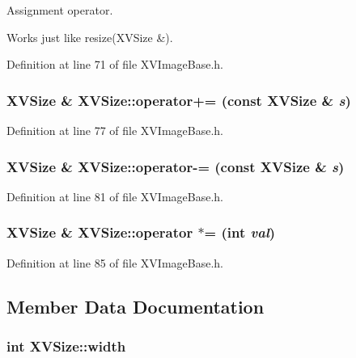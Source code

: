 Assignment operator.

Works just like resize(XVSize \&). 

Definition at line 71 of file XVImage\-Base.h.\label{XVSize_a11}
\hypertarget{class_XVSize_a11}{
\subsubsection[operator+=]{\setlength{\rightskip}{0pt plus 5cm}XVSize \& XVSize::operator+= (const XVSize \& {\em s})}}




Definition at line 77 of file XVImage\-Base.h.\label{XVSize_a12}
\hypertarget{class_XVSize_a12}{
\subsubsection[operator-=]{\setlength{\rightskip}{0pt plus 5cm}XVSize \& XVSize::operator-= (const XVSize \& {\em s})}}




Definition at line 81 of file XVImage\-Base.h.\label{XVSize_a13}
\hypertarget{class_XVSize_a13}{
\subsubsection[operator *=]{\setlength{\rightskip}{0pt plus 5cm}XVSize \& XVSize::operator $\ast$= (int {\em val})}}




Definition at line 85 of file XVImage\-Base.h.

\subsection{Member Data Documentation}
\label{XVSize_n0}
\hypertarget{class_XVSize_n0}{
\subsubsection[width]{\setlength{\rightskip}{0pt plus 5cm}int XVSize::width}}





